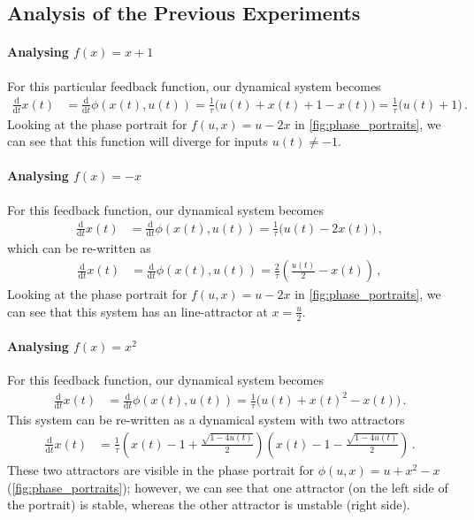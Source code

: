 \documentclass[10pt,letterpaper,oneside]{article}
\begin{document}
\subsection{Analysis of the Previous Experiments}

\paragraph{Analysing $f(x) = x + 1$}
For this particular feedback function, our dynamical system becomes
\begin{align*}
	\frac{\mathrm{d}}{\mathrm{d}t} x(t) &= \frac{\mathrm{d}}{\mathrm{d}t} \phi(x(t), u(t)) = \frac{1}{\tau} \big(u(t) + x(t) + 1 - x(t) \big) = \frac{1}{\tau} \big(u(t) + 1 \big) \,.
\end{align*}
Looking at the phase portrait for $f(u, x) = u - 2 x$ in \cref{fig:phase_portraits}, we can see that this function will diverge for inputs $u(t) \neq -1$.

\paragraph{Analysing $f(x) = -x$}
For this feedback function, our dynamical system becomes
\begin{align*}
	\frac{\mathrm{d}}{\mathrm{d}t} x(t) &= \frac{\mathrm{d}}{\mathrm{d}t} \phi(x(t), u(t)) = \frac{1}{\tau} \big(u(t) - 2 x(t) \big) \,,
\end{align*}
which can be re-written as
\begin{align*}
	\frac{\mathrm{d}}{\mathrm{d}t} x(t) &= \frac{\mathrm{d}}{\mathrm{d}t} \phi(x(t), u(t)) = \frac{2}{\tau} \left(\frac{u(t)}{2} - x(t) \right) \,,
\end{align*}
Looking at the phase portrait for $f(u, x) = u - 2x$ in \cref{fig:phase_portraits}, we can see that this system has an line-attractor at $x = \frac{u}{2}$.

\paragraph{Analysing $f(x) = x^2$}
For this feedback function, our dynamical system becomes
\begin{align*}
	\frac{\mathrm{d}}{\mathrm{d}t} x(t) &= \frac{\mathrm{d}}{\mathrm{d}t} \phi(x(t), u(t)) = \frac{1}{\tau} \big(u(t) + x(t)^2 - x(t) \big) \,.	
\end{align*}
This system can be re-written as a dynamical system with two attractors
\begin{align*}
	\frac{\mathrm{d}}{\mathrm{d}t} x(t) &=\frac{1}{\tau} \left( x(t) - 1 + \frac{\sqrt{1 - 4u(t)}}{2} \right) \left( x(t) - 1 - \frac{\sqrt{1 - 4u(t)}}{2} \right) \,.
\end{align*}
These two attractors are visible in the phase portrait for $\phi(u, x) = u + x^2 - x$ (\cref{fig:phase_portraits}); however, we can see that one attractor (on the left side of the portrait) is stable, whereas the other attractor is unstable (right side).
\end{document}
